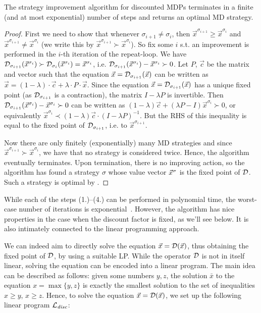\begin{theorem}
\label{5-thm:disc-strat-it}
The strategy improvement algorithm for discounted MDPs terminates in a finite (and at most exponential) number of steps and returns an optimal MD strategy.
\end{theorem}
\begin{proof}
First we need to show that whenever $\sigma_{i+1}\neq \sigma_i$, then  $\vec{x}^{\sigma_{i+1}} \geq \vec{x}^{\sigma_i}$ and $\vec{x}^{\sigma_{i+1}} \neq \vec{x}^{\sigma_i}$ (we write this by $\vec{x}^{\sigma_{i+1}} \succ\vec{x}^{\sigma_i}$). So fix some $ i $ s.t. an improvement is performed in the $ i $-th iteration of the repeat-loop. We have $\mathcal{D}_{\sigma_{i+1}}(\vec{x}^{\sigma_i})\succ\mathcal{D}_{\sigma_{i}}(\vec{x}^{\sigma_i})= \vec{x}^{\sigma_i}$, i.e. $\mathcal{D}_{\sigma_{i+1}}(\vec{x}^{\sigma_i})-\vec{x}^{\sigma_i} \succ 0$. Let $P$, $\vec{c}$ be the matrix and vector such that the equation $\vec{x}=\mathcal{D}_{\sigma_{i+1}}(\vec{x})$ can be written as $\vec{x}= (1-\lambda)\cdot \vec{c}+\lambda \cdot P\cdot\vec{x}$. Since the equation $\vec{x}=\mathcal{D}_{\sigma_{i+1}}(\vec{x})$ has a unique fixed point (as $ \mathcal{D}_{\sigma_{i+1}} $ is a contraction), the matrix $ I-\lambda P $ is invertible. Then $\mathcal{D}_{\sigma_{i+1}}(\vec{x}^{\sigma_i})-\vec{x}^{\sigma_i} \succ 0$ can be written as  $(1-\lambda)\vec{c} + (\lambda P - I)\vec{x}^{\sigma_i} \succ 0 $, or equivalently $\vec{x}^{\sigma_i}\prec (1-\lambda)\vec{c}\cdot(I-\lambda P)^{-1}.$ But the RHS of this inequality is equal to the fixed point of $\mathcal{D}_{\sigma_{i+1}}$, i.e. to $\vec{x}^{\sigma_{i+1}} .$

Now there are only finitely (exponentially) many MD strategies and since$\vec{x}^{\sigma_{i+1}} \succ\vec{x}^{\sigma_i}$, we have that no strategy is considered twice. Hence, the algorithm eventually terminates. Upon termination, there is no improving action, so the algorithm has found a strategy $\sigma$ whose value vector $\vec{x}^{\sigma}$ is the fixed point of $\mathcal{D}$. Such a strategy is optimal by . 
\end{proof}


While each of the steps (1.)--(4.) can be performed in polynomial time, the 
worst-case number of iterations is exponential~\cite{Hollanders&Delvenne&Jungers:2012}. However, the 
algorithm has nice properties in the case when the discount factor is fixed, as we'll see below. It is also intimately connected to the linear programming approach.

We can indeed aim to directly solve 
the equation $\vec{x} = \mathcal{D}(\vec{x})$, thus obtaining the fixed point of 
$\mathcal{D}$, by using a suitable LP. While the operator $\mathcal{D}$ is not 
in itself linear, solving the equation can be encoded into a linear  program. 
The main idea can be described as follows: given some numbers $y,z$, the 
solution $\bar{x}$ to the equation $x=\max\{y,z\}$ is exactly the smallest 
solution to the set of inequalities $x\geq y$, $x\geq z$. Hence, to solve the 
equation  $\vec{x} = \mathcal{D}(\vec{x})$, we set up the following linear program 
$\mathcal{L}_{\mathit{disc}}$:

